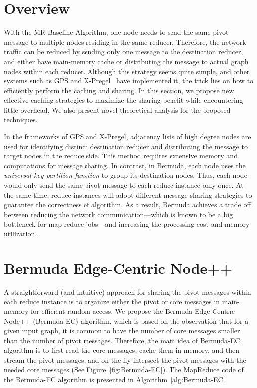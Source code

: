 \section{Overview}
\label{sec:bectech}
With the MR-Baseline Algorithm, one node needs to send the same pivot message to multiple nodes residing in the same reducer. Therefore, the network traffic can be reduced by sending only one message to the destination reducer, and either have main-memory cache or distributing the message 
to actual graph nodes within each reducer. Although this strategy seems quite simple, and other systems such as GPS and X-Pregel~\cite{X-Pregel,GPS} have implemented it, the trick lies on how to efficiently perform the caching and sharing. In this section, we propose new effective caching strategies to maximize the sharing benefit while encountering little overhead. We also present novel theoretical analysis for the proposed techniques. 

In the frameworks of GPS and X-Pregel, adjacency lists of high degree nodes are used for identifying distinct destination reducer and distributing the message to target nodes in the reduce side. This method requires extensive memory and computations for message sharing.  
In contrast, in Bermuda, each node uses the {\em universal key partition function} to group its destination nodes. Thus, each node would only send the same pivot 
message to each reduce instance only once. 
At the same time, reduce instances will adopt different message-sharing strategies to guarantee the correctness of algorithm. 
As a result,  Bermuda achieves a trade off between reducing the network communication---which is known to be a big bottleneck for map-reduce jobs---and increasing the processing cost and memory utilization. 

\section{Bermuda Edge-Centric Node++ }
\label{sec:EC}
A straightforward (and intuitive) approach for sharing the pivot messages within each reduce instance 
is to organize either the pivot or core messages in main-memory for efficient random access. 
We propose the Bermuda Edge-Centric Node++ (Bermuda-EC) algorithm,  which is based on the observation that for a given input graph, 
it is common to have the number of core messages smaller than the number of pivot messages. 
Therefore, the main idea of Bermuda-EC algorithm is to first read the core messages, cache them in memory, and then stream the pivot messages, 
and on-the-fly intersect the pivot messages with the needed core messages (See Figure~\ref{fig:Bermuda-EC}). 
The MapReduce code of the Bermuda-EC algorithm is presented in Algorithm~\ref{alg:Bermuda-EC}.

